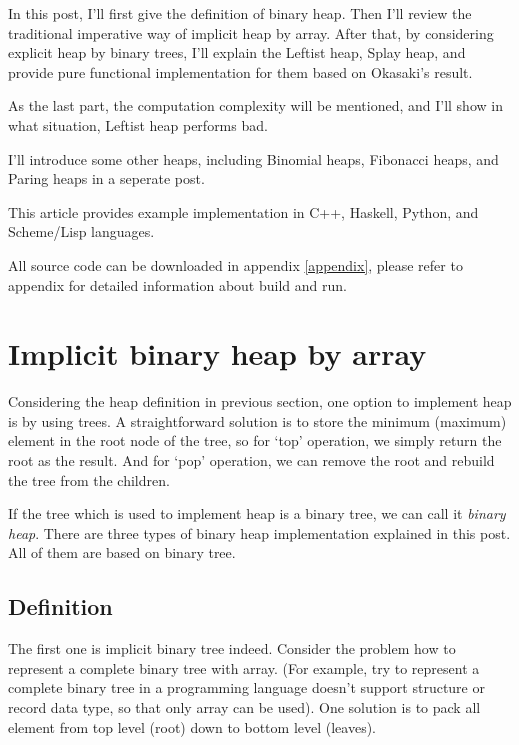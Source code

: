\documentclass{article}
\begin{document}
In this post, I'll first give the definition of binary heap. Then
I'll review the traditional imperative way of implicit heap by array.
After that, by considering explicit heap by binary trees, I'll
explain the Leftist heap, Splay heap, and provide pure functional implementation
for them based on Okasaki's result\cite{okasaki-book}.

As the last part, the computation complexity will be mentioned, and
I'll show in what situation, Leftist heap performs bad.

I'll introduce some other heaps, including Binomial heaps, Fibonacci
heaps, and Paring heaps in a seperate post.

This article provides example implementation in C++, Haskell, Python, and 
Scheme/Lisp languages. 

All source code can be downloaded in appendix \ref{appendix}, please 
refer to appendix for detailed information about build and run.


\section{Implicit binary heap by array}
\label{ibheap}

Considering the heap definition in previous section, one option to 
implement heap is by using trees. A straightforward solution is
to store the minimum (maximum) element in the root node of the 
tree, so for `top' operation, we simply return the root as the
result. And for `pop' operation, we can remove the root and 
rebuild the tree from the children.

If the tree which is used to implement heap is a binary tree, we
can call it {\em binary heap}. There are three types of binary
heap implementation explained in this post. All of them are
based on binary tree.

\subsection{Definition}

The first one is implicit binary tree indeed. Consider the problem
how to represent a complete binary tree with array. (For example, try to 
represent a complete binary tree in a programming language doesn't support structure
or record data type, so that only array can be used). One solution
is to pack all element from top level (root) down to bottom level (leaves).
\end{document}
